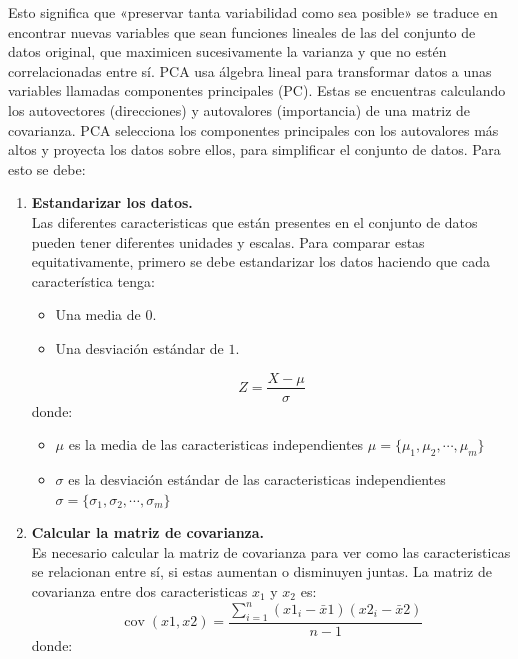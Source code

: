 \documentclass[12pt,letterpaper,oneside,openright]{book}
\begin{document}
	Esto significa que «preservar tanta variabilidad como sea posible» se traduce en encontrar nuevas variables que sean funciones lineales de las del conjunto de datos original, que maximicen sucesivamente la varianza y que no estén correlacionadas entre sí. PCA usa álgebra lineal para transformar datos a unas variables llamadas componentes principales (PC). Estas se encuentras calculando los autovectores (direcciones) y autovalores (importancia) de una matriz de covarianza. PCA selecciona los componentes principales con los autovalores más altos y proyecta los datos sobre ellos, para simplificar el conjunto de datos. Para esto se debe: \\
	\begin{enumerate}
		\item \textbf{Estandarizar los datos.} \\
		Las diferentes caracteristicas que están presentes en el conjunto de datos pueden tener diferentes unidades y escalas. Para comparar estas equitativamente, primero se debe estandarizar los datos haciendo que cada característica tenga: 
		\begin{itemize}
			\item Una media de $0$.
			\item Una desviación estándar de $1$.
		\end{itemize}
		\begin{equation}
			\label{eq:standard}
			Z = \frac{\textit{X}-\mu}{\sigma}
		\end{equation}
		donde:
		\begin{itemize}
			\item $\mu$ es la media de las caracteristicas independientes $\mu = \{\mu_1, \mu_2,\dotsb,\mu_m\}$
			\item $\sigma$ es la desviación estándar de las caracteristicas independientes $\sigma = \{\sigma_1, \sigma_2,\dotsb,\sigma_m\}$
		\end{itemize}
		\item \textbf{Calcular la matriz de covarianza.}\\
		Es necesario calcular la matriz de covarianza para ver como las caracteristicas se relacionan entre sí, si estas aumentan o disminuyen juntas. La matriz de covarianza entre dos caracteristicas $x_1$ y $x_2$ es:
		\begin{equation}
			\label{eq:covarianza}
			\operatorname{cov}(x 1, x 2)=\frac{\sum_{i=1}^n\left(x 1_i-\bar{x} 1\right)\left(x 2_i-\bar{x} 2\right)}{n-1}
		\end{equation}
		donde: 
		\begin{itemize}

\end{itemize}
\end{enumerate}
\end{document}
